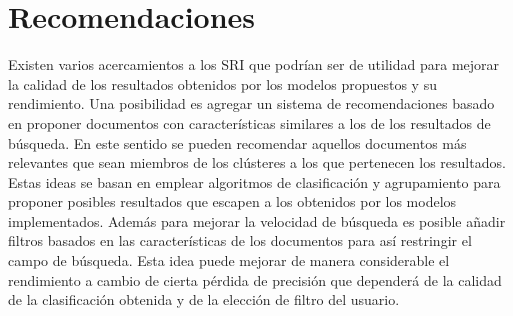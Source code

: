 \documentclass[12pt]{llncs}
\begin{document}
\section*{Recomendaciones}

Existen varios acercamientos a los SRI que podrían ser de utilidad para mejorar la calidad de los resultados obtenidos por los modelos propuestos y su rendimiento. Una posibilidad es agregar un sistema de recomendaciones basado en proponer documentos con características similares a los de los resultados de búsqueda. En este sentido se pueden recomendar aquellos documentos más relevantes que sean miembros de los clústeres a los que pertenecen los resultados. Estas ideas se basan en emplear algoritmos de clasificación y agrupamiento para proponer posibles resultados que escapen a los obtenidos por los modelos implementados. Además para mejorar la velocidad de búsqueda es posible añadir filtros basados en las características de los documentos para así restringir el campo de búsqueda. Esta idea puede mejorar de manera considerable el rendimiento a cambio de cierta pérdida de precisión que dependerá de la calidad de la clasificación obtenida y de la elección de filtro del usuario.


 

\end{document}

